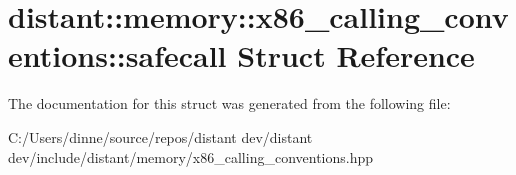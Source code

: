 \hypertarget{structdistant_1_1memory_1_1x86__calling__conventions_1_1safecall}{}\section{distant\+:\+:memory\+:\+:x86\+\_\+calling\+\_\+conventions\+:\+:safecall Struct Reference}
\label{structdistant_1_1memory_1_1x86__calling__conventions_1_1safecall}


The documentation for this struct was generated from the following file\+:\begin{DoxyCompactItemize}
\item 
C\+:/\+Users/dinne/source/repos/distant dev/distant dev/include/distant/memory/x86\+\_\+calling\+\_\+conventions.\+hpp\end{DoxyCompactItemize}

